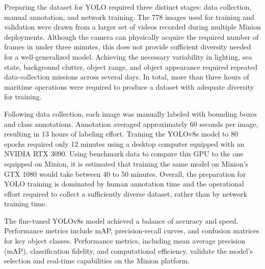 \documentclass{erauthesis}
\begin{document}
Preparing the dataset for YOLO required three distinct stages: data collection, manual annotation, and network training. 
The 778 images used for training and validation were drawn from a larger set of videos recorded during multiple Minion deployments. 
Although the camera can physically acquire the required number of frames in under three minutes, this does not provide sufficient diversity needed for a well-generalized model. 
Achieving the necessary variability in lighting, sea state, background clutter, object range, and object appearance required repeated data-collection missions across several days. 
In total, more than three hours of maritime operations were required to produce a dataset with adequate diversity for training.

Following data collection, each image was manually labeled with bounding boxes and class annotations. 
Annotation averaged approximately 60 seconds per image, resulting in 13 hours of labeling effort. 
Training the YOLOv8s model to 80 epochs required only 12 minutes using a desktop computer equipped with an NVIDIA RTX 3090. Using benchmark data to compare this GPU to the one equipped on Minion, it is estimated that training the same model on Minion's GTX 1080 would take between 40 to 50 minutes.
Overall, the preparation for YOLO training is dominated by human annotation time and the operational effort required to collect a sufficiently diverse dataset, rather than by network training time.

The fine-tuned YOLOv8s model achieved a balance of accuracy and speed.
Performance metrics include \ac{mAP}, precision-recall curves, and confusion matrices for key object classes.
Performance metrics, including mean average precision (mAP), classification fidelity, and computational efficiency, validate the model’s selection and real-time capabilities on the Minion platform.

\end{document}
